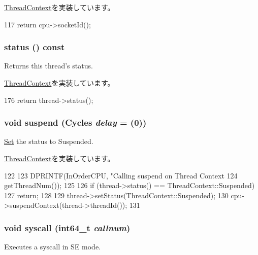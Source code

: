 \hyperlink{classThreadContext_aba2c497e8af03f742e5ece80efaeb197}{ThreadContext}を実装しています。


\begin{DoxyCode}
117 { return cpu->socketId(); }
\end{DoxyCode}
\hypertarget{classInOrderThreadContext_a2ad9e92a82d6f783b3061584729c2f4a}{
\subsubsection[{status}]{ status () const}}
\label{classInOrderThreadContext_a2ad9e92a82d6f783b3061584729c2f4a}
Returns this thread's status. 

\hyperlink{classThreadContext_adfba9b39542cba955a02b8ff3ba023a9}{ThreadContext}を実装しています。


\begin{DoxyCode}
176 { return thread->status(); }
\end{DoxyCode}
\hypertarget{classInOrderThreadContext_a32072550286c5735b4b95349efa8e4f6}{
\subsubsection[{suspend}]{\setlength{\rightskip}{0pt plus 5cm}void suspend ({\bf Cycles} {\em delay} = {(0)})}}
\label{classInOrderThreadContext_a32072550286c5735b4b95349efa8e4f6}
\hyperlink{classSet}{Set} the status to Suspended. 

\hyperlink{classThreadContext_af2ae27d19d77b0301484ac488d97d37b}{ThreadContext}を実装しています。


\begin{DoxyCode}
122 {
123     DPRINTF(InOrderCPU, "Calling suspend on Thread Context %
124             getThreadNum());
125 
126     if (thread->status() == ThreadContext::Suspended)
127         return;
128 
129     thread->setStatus(ThreadContext::Suspended);
130     cpu->suspendContext(thread->threadId());
131 }
\end{DoxyCode}
\hypertarget{classInOrderThreadContext_a36e0b96120fcbbc2ee8699158f7be5c2}{
\subsubsection[{syscall}]{\setlength{\rightskip}{0pt plus 5cm}void syscall (int64\_\-t {\em callnum})}}
\label{classInOrderThreadContext_a36e0b96120fcbbc2ee8699158f7be5c2}
Executes a syscall in SE mode. 

